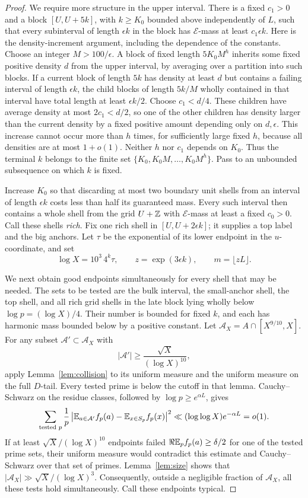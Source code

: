 \begin{proof}
We require more structure in the upper interval. There is a fixed
\(c_1>0\) and a block \([U,U+5k]\), with \(k\ge K_0\) bounded above
independently of \(L\), such that every subinterval of length
\(\epsilon k\) in the block has \(\mathcal E\)-mass at least
\(c_1\epsilon k\). Here is the density-increment argument, including
the dependence of the constants. Choose an integer
\(M>100/\epsilon\). A block of fixed length \(5K_0M^h\) inherits
some fixed positive density \(d\) from the upper interval, by
averaging over a partition into such blocks. If a current block of
length \(5k\) has density at least \(d\) but contains a failing
interval of length \(\epsilon k\), the child blocks of length
\(5k/M\) wholly contained in that interval have total length at
least \(\epsilon k/2\). Choose \(c_1<d/4\). These children have
average density at most \(2c_1<d/2\), so one of the other children
has density larger than the current density by a fixed positive
amount depending only on \(d,\epsilon\). This increase cannot occur
more than \(h\) times, for sufficiently large fixed \(h\), because
all densities are at most \(1+o(1)\). Neither \(h\) nor \(c_1\)
depends on \(K_0\). Thus the terminal \(k\) belongs to the finite set
\(\{K_0,K_0M,\ldots,K_0M^h\}\). Pass to an unbounded subsequence
on which \(k\) is fixed.

Increase \(K_0\) so that discarding at most two boundary unit
shells from an interval of length \(\epsilon k\) costs less than
half its guaranteed mass. Every such interval then contains a
whole shell from the grid \(U+\mathbb Z\) with \(\mathcal E\)-mass at
least a fixed \(c_0>0\). Call these shells \emph{rich}. Fix one
rich shell in \([U,U+2\epsilon k]\); it supplies a top label and
the big anchors. Let \(\tau\) be the exponential of its lower
endpoint in the \(u\)-coordinate, and set
\[
 \log X=10^3\,4^k\tau,\qquad
 z=\exp(3\epsilon k),\qquad m=\lfloor zL\rfloor .
\]

We next obtain good endpoints simultaneously for every shell that
may be needed. The sets to be tested are the bulk interval, the
small-anchor shell, the top shell, and all rich grid shells in the
late block lying wholly below \(\log p=(\log X)/4\). Their number
is bounded for fixed \(k\), and each has harmonic mass bounded
below by a positive constant. Let
\(\mathcal A_X=A\cap[X^{9/10},X]\).
For any subset \(\mathcal A'\subset\mathcal A_X\) with
\[
 |\mathcal A'|\ge\frac{\sqrt X}{(\log X)^{10}},
\]
apply Lemma~\ref{lem:collision} to its uniform measure and the
uniform measure on the full \(D\)-tail. Every tested prime is
below the cutoff in that lemma. Cauchy--Schwarz on the residue
classes, followed by \(\log p\ge e^{\alpha L}\), gives
\[
 \sum_{\text{tested }p}\frac1p
 \left|\mathbb E_{a\in\mathcal A'}f_p(a)
       -\mathbb E_{x\in S_p}f_p(x)\right|^2
 \ll (\log\log X)e^{-\alpha L}=o(1).
\]
If at least \(\sqrt X/(\log X)^{10}\) endpoints failed
\(\Re\mathbb E_p f_p(a)\ge\delta/2\) for one of the tested prime sets,
their uniform measure would contradict this estimate and
Cauchy--Schwarz over that set of primes. Lemma~\ref{lem:size}
shows that \(|\mathcal A_X|\gg\sqrt X/(\log X)^3\).
Consequently, outside a negligible fraction of \(\mathcal A_X\),
all these tests hold simultaneously. Call these endpoints typical.


\end{proof}
